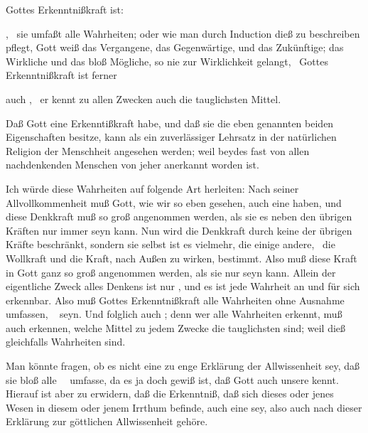 \begin{aufza}
\item Gottes Erkenntnißkraft ist:
\begin{aufzb}
\item {}, \dh\ sie umfaßt alle Wahrheiten; oder wie man durch Induction dieß zu beschreiben pflegt, Gott weiß das Vergangene, das Gegenwärtige, und das Zukünftige; das Wirkliche und das bloß Mögliche, so nie zur Wirklichkeit gelangt, \usw\ Gottes Erkenntnißkraft ist ferner
\item auch , \dh\ er kennt zu allen Zwecken auch die tauglichsten Mittel.
\end{aufzb}
\item Daß Gott eine Erkenntißkraft habe, und daß sie die eben genannten beiden Eigenschaften besitze, kann als ein zuverlässiger Lehrsatz in der natürlichen Religion der Menschheit angesehen werden; weil beydes fast von allen nachdenkenden Menschen von jeher anerkannt worden ist.
\item Ich würde diese Wahrheiten auf folgende Art herleiten: Nach seiner Allvollkommenheit muß Gott, wie wir so eben gesehen, auch eine  haben, und diese Denkkraft muß so groß angenommen werden, als sie es neben den übrigen Kräften nur immer seyn kann. Nun wird die Denkkraft durch keine der übrigen Kräfte beschränkt, sondern sie selbst ist es vielmehr, die einige andere, \zB\ die Wollkraft und die Kraft, nach Außen zu wirken, bestimmt. Also muß diese Kraft in Gott ganz so groß angenommen werden, als sie nur  seyn kann. Allein der eigentliche Zweck alles Denkens ist nur , und es ist jede Wahrheit an und für sich erkennbar. Also muß Gottes Erkenntnißkraft alle Wahrheiten ohne Ausnahme umfassen, \dh\  seyn. Und folglich auch ; denn wer alle Wahrheiten erkennt, muß auch erkennen, welche Mittel zu jedem Zwecke die tauglichsten sind; weil dieß gleichfalls Wahrheiten sind.
\begin{RWanm}[Anm.~1.]
Man könnte fragen, ob es nicht eine zu enge Erklärung der Allwissenheit sey, daß sie bloß alle ~\ umfasse, da es ja doch gewiß ist, daß Gott auch unsere  kennt. Hierauf ist aber zu erwidern, daß die Erkenntniß, daß sich dieses oder jenes Wesen in diesem oder jenem Irrthum befinde, auch eine  sey, also auch nach dieser Erklärung zur göttlichen Allwissenheit gehöre.

\end{RWanm}
\end{aufza}
